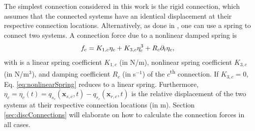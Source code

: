 \documentclass{article}
\begin{document}
The simplest connection considered in this work is the rigid connection, which assumes that the connected systems have an identical displacement at their respective connection locations. Alternatively, as done in \cite{theBible, Bilbao2009Modular}, one can use a spring to connect two systems. A connection force due to a nonlinear damped spring is
\begin{equation}\label{eq:nonlinearSpring}
    f_{\text{c}} = K_{1, c}\eta_c + K_{3, c}\eta_c^3 + R_c\partial_t \eta_c,
\end{equation}
with is a linear spring coefficient $K_{1, c}$ (in N/m),  nonlinear spring coefficient $K_{3, c}$ (in N/m$^3$), and damping coefficient $R_c$ (in s$^{-1}$) of the $c$\textsuperscript{th} connection. If $K_{3, c} = 0$, Eq. \eqref{eq:nonlinearSpring} reduces to a linear spring. Furthermore, $\eta_c = \eta_c(t) = q_{s_c}(\boldsymbol{x}_{s,c} ,t) - q_{r_c}(\boldsymbol{x}_{r,c} ,t)$ is the relative displacement of the two systems at their respective connection locations (in m). %
Section \ref{sec:discConnections} will elaborate on how to calculate the connection forces in all cases.

  
\end{document}
